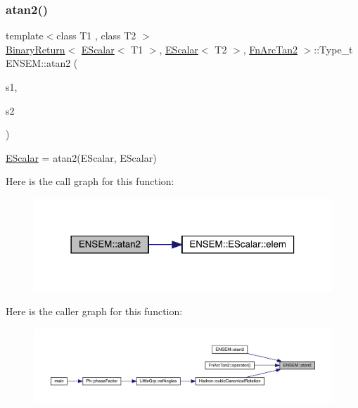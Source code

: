 \subsubsection{\texorpdfstring{atan2()}{atan2()}}
{\footnotesize\ttfamily template$<$class T1 , class T2 $>$ \\
\mbox{\hyperlink{structENSEM_1_1BinaryReturn}{Binary\+Return}}$<$ \mbox{\hyperlink{classENSEM_1_1EScalar}{E\+Scalar}}$<$ T1 $>$, \mbox{\hyperlink{classENSEM_1_1EScalar}{E\+Scalar}}$<$ T2 $>$, \mbox{\hyperlink{structENSEM_1_1FnArcTan2}{Fn\+Arc\+Tan2}} $>$\+::Type\+\_\+t E\+N\+S\+E\+M\+::atan2 (\begin{DoxyParamCaption}\item[{const \mbox{\hyperlink{classENSEM_1_1EScalar}{E\+Scalar}}$<$ T1 $>$ \&}]{s1,  }\item[{const \mbox{\hyperlink{classENSEM_1_1EScalar}{E\+Scalar}}$<$ T2 $>$ \&}]{s2 }\end{DoxyParamCaption})\hspace{0.3cm}{\ttfamily [inline]}}



\mbox{\hyperlink{classENSEM_1_1EScalar}{E\+Scalar}} = atan2(\+E\+Scalar, E\+Scalar) 

Here is the call graph for this function\+:
\nopagebreak
\begin{figure}[H]
\begin{center}
\leavevmode
\includegraphics[width=318pt]{d4/dca/group__escalar_ga9a9d48948d119981259ad0ebcb0acfea_cgraph}
\end{center}
\end{figure}
Here is the caller graph for this function\+:
\nopagebreak
\begin{figure}[H]
\begin{center}
\leavevmode
\includegraphics[width=350pt]{d4/dca/group__escalar_ga9a9d48948d119981259ad0ebcb0acfea_icgraph}
\end{center}
\end{figure}
\mbox{\label{group__escalar_ga1fe36c2ff072b322fac723a4e44f6584}} 
